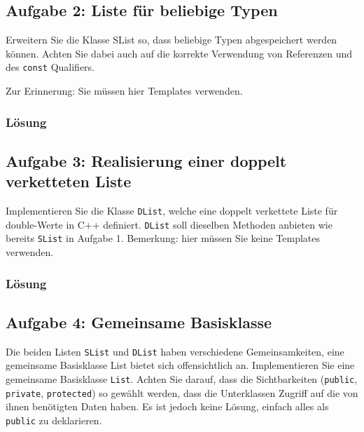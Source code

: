 \subsection{Aufgabe 2: Liste für beliebige Typen}

Erweitern Sie die Klasse SList so, dass beliebige Typen abgespeichert werden können. Achten Sie dabei
auch auf die korrekte Verwendung von Referenzen und des \texttt{const} Qualifiers.

Zur Erinnerung: Sie müssen hier Templates verwenden.

\subsubsection{Lösung}


\noindent\makebox[\linewidth]{\rule{\paperwidth}{0.4pt}}


\subsection{Aufgabe 3: Realisierung einer doppelt verketteten Liste}

Implementieren Sie die Klasse \texttt{DList}, welche eine doppelt verkettete Liste für double-Werte in C++ definiert.
\texttt{DList} soll dieselben Methoden anbieten wie bereits \texttt{SList} in Aufgabe 1.
Bemerkung: hier müssen Sie keine Templates verwenden.

\subsubsection{Lösung}


\noindent\makebox[\linewidth]{\rule{\paperwidth}{0.4pt}}


\subsection{Aufgabe 4: Gemeinsame Basisklasse}

Die beiden Listen \texttt{SList} und \texttt{DList} haben verschiedene Gemeinsamkeiten, eine gemeinsame Basisklasse
List bietet sich offensichtlich an. Implementieren Sie eine gemeinsame Basisklasse \texttt{List}. Achten Sie darauf,
dass die Sichtbarkeiten (\texttt{public}, \texttt{private}, \texttt{protected}) so gewählt werden, dass die Unterklassen Zugriff
auf die von ihnen benötigten Daten haben. Es ist jedoch keine Lösung, einfach alles als \texttt{public} zu deklarieren.


